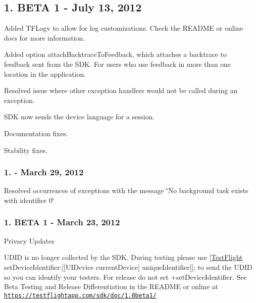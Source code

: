 \subsection*{1. B\-E\-T\-A 1 -\/ July 13, 2012}


\begin{DoxyItemize}
\item Added T\-F\-Logv to allow for log customizations. Check the R\-E\-A\-D\-M\-E or online docs for more information.
\item Added option attach\-Backtrace\-To\-Feedback, which attaches a backtrace to feedback sent from the S\-D\-K. For users who use feedback in more than one location in the application.
\item Resolved issue where other exception handlers would not be called during an exception.
\item S\-D\-K now sends the device language for a session.
\item Documentation fixes.
\item Stability fixes.
\end{DoxyItemize}

\subsubsection*{1. -\/ March 29, 2012}


\begin{DoxyItemize}
\item Resolved occurrences of exceptions with the message \char`\"{}\-No background task exists with identifier 0\char`\"{}
\end{DoxyItemize}

\subsubsection*{1. B\-E\-T\-A 1 -\/ March 23, 2012}


\begin{DoxyItemize}
\item Privacy Updates
\item U\-D\-I\-D is no longer collected by the S\-D\-K. During testing please use {\ttfamily \mbox{[}\hyperlink{interface_test_flight}{Test\-Flight} set\-Device\-Identifier\-:\mbox{[}\mbox{[}U\-I\-Device current\-Device\mbox{]} unique\-Identifier\mbox{]}\mbox{]};} to send the U\-D\-I\-D so you can identify your testers. For release do not set {\ttfamily +set\-Device\-Identifier}. See Beta Testing and Release Differentiation in the R\-E\-A\-D\-M\-E or online at \href{http://testflightapp.com/sdk/doc/1.0beta1/}{\tt https\-://testflightapp.\-com/sdk/doc/1.\-0beta1/}
\end{DoxyItemize}

